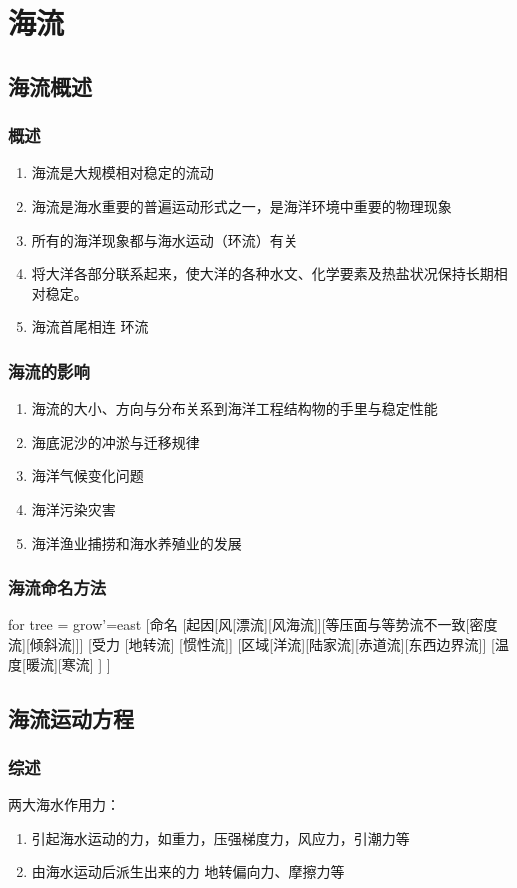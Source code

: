 \section{海流}
\subsection{海流概述}
	\subsubsection{概述}
	\begin{enumerate}[1)]
		\item 海流是大规模相对稳定的流动
		\item 海流是海水重要的普遍运动形式之一，是海洋环境中重要的物理现象
		\item 所有的海洋现象都与海水运动（环流）有关
		\item 将大洋各部分联系起来，使大洋的各种水文、化学要素及热盐状况保持长期相对稳定。
		\item 海流首尾相连 环流
	\end{enumerate}
	
	\subsubsection{海流的影响}
		\begin{enumerate} [1)]
			\item 海流的大小、方向与分布关系到海洋工程结构物的手里与稳定性能
			\item 海底泥沙的冲淤与迁移规律
			\item 海洋气候变化问题
			\item 海洋污染灾害
			\item 海洋渔业捕捞和海水养殖业的发展
		\end{enumerate}
	\subsubsection{海流命名方法}
		\begin{forest}
			for tree = {grow'=east}
			[命名
			[起因[风[漂流][风海流]][等压面与等势流不一致[密度流][倾斜流]]]
			[受力
			[地转流]
			[惯性流]]
			[区域[洋流][陆家流][赤道流][东西边界流]]
			[温度[暖流][寒流]
			]
			]
		\end{forest}
\subsection*{海流运动方程}
	\subsubsection{综述}
	两大海水作用力：
	\begin{enumerate}[1)]
		\item 引起海水运动的力，如重力，压强梯度力，风应力，引潮力等
		\item 由海水运动后派生出来的力 地转偏向力、摩擦力等
	\end{enumerate}
